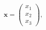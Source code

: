 \documentclass[preview]{standalone}
\begin{document}
\begin{align*}
\mathbf{x} = \begin{pmatrix} x_1 \\ x_2 \\ x_3 \end{pmatrix}, \quad
\end{align*}
\end{document}
